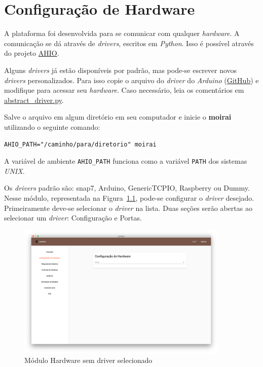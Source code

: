
\chapter{Configuração de Hardware}%
\label{chapter:hardware-configuration}

A plataforma foi desenvolvida para se comunicar com qualquer \textit{hardware}.
A comunicação se dá através de \textit{drivers}, escritos em \textit{Python}.
Isso é possível através do projeto
\href{https://github.com/acristoffers/ahio}{AHIO}.

Alguns \textit{drivers} já estão disponíveis por padrão, mas pode-se escrever
novos \textit{drivers} personalizados. Para isso copie o arquivo do
\textit{driver} do \textit{Arduino}
(\href{https://github.com/acristoffers/ahio/blob/master/ahio/drivers/arduino.py}{GitHub})
e modifique para acessar seu \textit{hardware}. Caso necessário, leia os
comentários em
\href{https://github.com/acristoffers/ahio/blob/master/ahio/abstract_driver.py}{abstract\_driver.py}.

Salve o arquivo em algum diretório em seu computador e inicie o \textbf{moirai}
utilizando o seguinte comando:

\texttt{AHIO_PATH="/caminho/para/diretorio" moirai}

A variável de ambiente \texttt{AHIO_PATH} funciona como a variável
\texttt{PATH} dos sistemas \textit{UNIX}.

Os \textit{drivers} padrão são: snap7, Arduino, GenericTCPIO, Raspberry ou
Dummy. Nesse módulo, representada na Figura~\ref{fig:hardware1}, pode-se
configurar o \textit{driver} desejado. Primeiramente deve-se selecionar o
\textit{driver} na lista. Duas seções serão abertas ao selecionar um
\textit{driver}: Configuração e Portas.

\begin{figure}[ht!]
    \centering
    \includegraphics[width=0.9\textwidth]{imgs/hardware}
    \caption[Módulo Hardware sem driver selecionado]{Módulo Hardware sem driver selecionado}%
    \label{fig:hardware1}
\end{figure}


